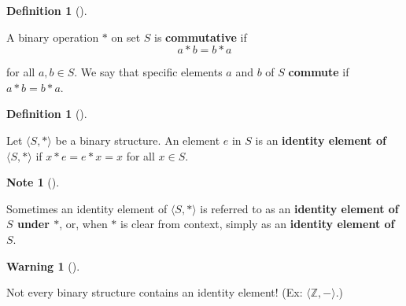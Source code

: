 \documentclass[10pt,]{book}
\newcommand{\terminology}[1]{\textbf{#1}}
\theoremstyle{plain}
\theoremstyle{definition}
\newtheorem{definition}[theorem]{Definition}
\theoremstyle{definition}
\newtheorem{note}[theorem]{Note}
\newtheorem{warning}[theorem]{Warning}
\theoremstyle{definition}
\theoremstyle{definition}
\numberwithin{equation}{section}
\def\Z{\mathbb{Z}}
\begin{document}
\begin{definition}[{}]\label{definition-16}

        A binary operation \(*\) on set \(S\) is \terminology{commutative} if
\begin{equation*}

          a*b=b*a
        
\end{equation*}

        for all \(a,b\in S\). We say that specific elements
        \(a\) and \(b\) of \(S\) \terminology{commute} if \(a*b=b*a\).
\end{definition}
\begin{definition}[{}]\label{definition-17}

        Let \(\langle S,*\rangle\) be a binary structure. An element \(e\) in
        \(S\) is an \terminology{identity element of \(\langle S,*\rangle\)} if \(x*e=e*x=x\) for all
        \(x\in S\).
\label{notation-31}
\end{definition}
\begin{note}[]\label{note-4}

    Sometimes an identity element of \(\langle S,*\rangle\) is referred to as an \terminology{identity element of \(S\) under \(*\)}, or, when \(*\) is clear from context, simply
    as an \terminology{identity element of \(S\)}.
\end{note}
\begin{warning}[]\label{warning-4}

      Not every binary structure contains an identity element! (Ex: \(\langle \Z,-\rangle\).)
\end{warning}
\par
\end{document}
